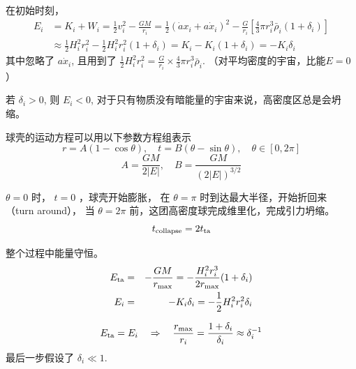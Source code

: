 \documentclass[12pt]{ctexart}
\begin{document}
在初始时刻，
\begin{equation}
    \begin{aligned}
        E_{i} &=K_{i}+W_{i}=\frac{1}{2} v_{i}^{2}-\frac{G M}{r_{i}}=\frac{1}{2}\left(\dot{a} x_{i}+a \dot{x}_{i}\right)^{2}-\frac{G}{r_{i}}\left[\frac{4}{3} \pi r_{i}^{3} \bar{\rho}_{i}\left(1+\delta_{i}\right)\right] \\
        & \approx \frac{1}{2} H_{i}^{2} r_{i}^{2}-\frac{1}{2} H_{i}^{2} r_{i}^{2}\left(1+\delta_{i}\right)=K_{i}-K_{i}\left(1+\delta_{i}\right)=-K_{i} \delta_{i}
    \end{aligned}
\end{equation}
其中忽略了  $a \dot{x}_{i}$, 且用到了 
$\frac{1}{2} H_{i}^{2} r_{i}^{2} = \frac{G}{r_i} \times \frac{4}{3} \pi r_{i}^{3} \bar{\rho}_{i}$.
（对平均密度的宇宙，比能$E=0$）

若 $\delta_i>0$, 则 $E_i<0$, 对于只有物质没有暗能量的宇宙来说，高密度区总是会坍缩。

球壳的运动方程可以用以下参数方程组表示
\begin{equation} \label{eq:EoM}
    r=A(1-\cos \theta), \quad 
    t=B(\theta-\sin \theta), \quad
    \theta \in[0,2 \pi]
\end{equation}
\begin{equation}
    A=\frac{G M}{2|E|}, \quad
    B=\frac{G M}{(2|E|)^{3 / 2}}
\end{equation}

$\theta=0$ 时， $t=0$ ，球壳开始膨胀，
在 $\theta=\pi$ 时到达最大半径，开始折回来 （turn around），
当 $\theta= 2\pi$ 前，这团高密度球完成维里化，完成引力坍缩。
\begin{equation}
    t_{\rm{collapse}} = 2 t_{\rm{ta}}
\end{equation}

整个过程中能量守恒。
\begin{eqnarray}
    E_{\rm{ta}}  &=& -\frac{GM}{r_{\rm{max}}} = -\frac{H_i^2 r_i^3}{2 r_{\rm{max}} } (1+\delta_i) \\ 
    E_i &=& -K_i \delta_i = -\frac{1}{2} H_i^2 r_i^2 \delta_i
\end{eqnarray}

\begin{equation} \label{eq:r_max}
    E _{\rm{ta}} = E_i \quad \Rightarrow \quad \frac{r_{\max }}{r_{i}}=\frac{1+\delta_{i}}{\delta_{i}} \approx \delta_{i}^{-1}
\end{equation}
最后一步假设了 $\delta_i \ll 1$.
\end{document}
